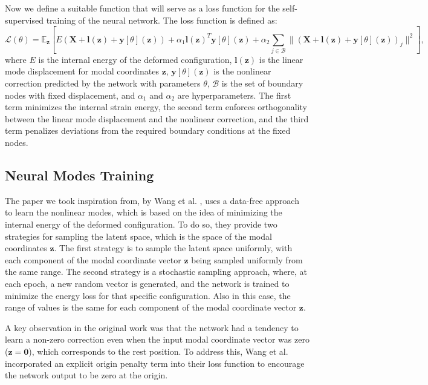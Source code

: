 Now we define a suitable function that will serve as a loss function for the self-supervised training of the neural network. The loss function is defined as:
\begin{equation}
    \mathcal{L}(\theta) = \mathbb{E}_{\mathbf{z}} \left[ E(\bm{X} + \bm{l}(\mathbf{z}) + \bm{y}[\theta](\mathbf{z})) + \alpha_1 \bm{l}(\mathbf{z})^T \bm{y}[\theta](\mathbf{z}) + \alpha_2 \sum_{j \in \mathcal{B}} \|(\bm{X} + \bm{l}(\mathbf{z}) + \bm{y}[\theta](\mathbf{z}))_j\|^2 \right],
\end{equation}
where \( E \) is the internal energy of the deformed configuration, \( \bm{l}(\mathbf{z}) \) is the linear mode displacement for modal coordinates \( \mathbf{z} \), \( \bm{y}[\theta](\mathbf{z}) \) is the nonlinear correction predicted by the network with parameters \( \theta \), \( \mathcal{B} \) is the set of boundary nodes with fixed displacement, and \( \alpha_1 \) and \( \alpha_2 \) are hyperparameters. The first term minimizes the internal strain energy, the second term enforces orthogonality between the linear mode displacement and the nonlinear correction, and the third term penalizes deviations from the required boundary conditions at the fixed nodes.




\subsection{Neural Modes Training} %
\label{sec:training_neural_modes}
The paper we took inspiration from, by Wang et al. \cite{Wang_Du_Coros_Thomaszewski_2024}, uses a data-free approach to learn the nonlinear modes, which is based on the idea of minimizing the internal energy of the deformed configuration. To do so, they provide two strategies for sampling the latent space, which is the space of the modal coordinates \( \mathbf{z} \). The first strategy is to sample the latent space uniformly, with each component of the modal coordinate vector \( \mathbf{z} \) being sampled uniformly from the same range. The second strategy is a stochastic sampling approach, where, at each epoch, a new random vector is generated, and the network is trained to minimize the energy loss for that specific configuration. Also in this case, the range of values is the same for each component of the modal coordinate vector \( \mathbf{z} \).

A key observation in the original work was that the network had a tendency to learn a non-zero correction even when the input modal coordinate vector was zero (\(\mathbf{z} = \bm{0}\)), which corresponds to the rest position. To address this, Wang et al. \cite{Wang_Du_Coros_Thomaszewski_2024} incorporated an explicit origin penalty term into their loss function to encourage the network output to be zero at the origin.

